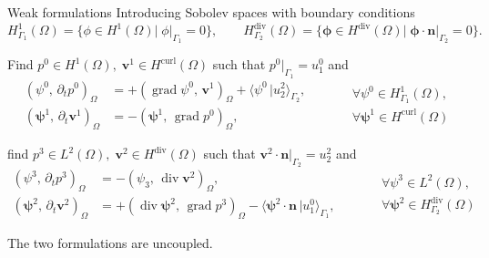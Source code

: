 \documentclass[aspectratio=169]{beamer}
\DeclareMathOperator*{\grad}{grad}
\renewcommand{\div}{\operatorname{div}}
\DeclareMathOperator*{\curl}{curl}
\newcommand{\inpr}[3][]{\ensuremath{( #2, \, #3 )_{#1}}}
\newcommand{\dualpr}[3][]{\ensuremath{\langle #2 \, \vert #3 \rangle_{#1}}}
\begin{document}
\begin{frame}{Weak formulations}
Introducing Sobolev spaces with boundary conditions	
\begin{equation*}
		H^1_{\Gamma_1}(\Omega) = \{\phi \in H^1(\Omega) |\; \phi|_{\Gamma_1} = 0\}, \qquad
		H^{\div}_{\Gamma_2}(\Omega) = \{\bm{\phi} \in H^{\div}(\Omega) |\; \bm{\phi} \cdot \bm{n}|_{\Gamma_2} = 0\}.
\end{equation*}


\begin{tcolorbox}[nobeforeafter, colframe=theme,title=Primal weak formulation]%
Find $p^0 \in H^1(\Omega), \; \bm{v}^1 \in H^{\curl}(\Omega)$ such that $p^0|_{\Gamma_1} = u^0_1$ and
\begin{equation*}
	\begin{aligned}
		\inpr[\Omega]{\psi^0}{\partial_t p^0} &= +\inpr[\Omega]{\grad \psi^0}{\bm{v}^1} + \dualpr[\Gamma_2]{\psi^0}{u^2_2}, \\
		\inpr[\Omega]{\bm{\psi}^1}{\partial_t \bm{v}^1} &= -\inpr[\Omega]{\bm{\psi}^1}{\grad {p}^0},
	\end{aligned} \qquad
	\begin{aligned}
		&\forall \psi^0 \in H^1_{\Gamma_1}(\Omega), \\
		&\forall \bm{\psi}^1 \in H^{\curl}(\Omega)
	\end{aligned}
\end{equation*}
\end{tcolorbox} 

\begin{tcolorbox}[nobeforeafter, colframe=theme,title=Dual weak formulation]%
find $p^3 \in L^2(\Omega), \; \bm{v}^2 \in H^{\div}(\Omega)$ such that $\bm{v}^2 \cdot \bm{n}|_{\Gamma_2} = u^2_2$ and
\begin{equation*}
	\begin{aligned}
		\inpr[\Omega]{\psi^3}{\partial_t p^3} &= -\inpr[\Omega]{\psi_3}{\div\bm{v}^2}, \\
		\inpr[\Omega]{\bm{\psi}^2}{\partial_t \bm{v}^2} &= +\inpr[\Omega]{\div \bm{\psi}^2}{\grad {p}^3} - \dualpr[\Gamma_1]{\bm{\psi}^2 \cdot \bm{n}}{u^0_1},
	\end{aligned} \qquad
	\begin{aligned}
		&\forall \psi^3 \in L^2(\Omega), \\
		&\forall \bm{\psi}^2 \in H^{\div}_{\Gamma_2}(\Omega)
	\end{aligned}
\end{equation*}
\end{tcolorbox} 
The two formulations are uncoupled.
\end{frame}
\end{document}
